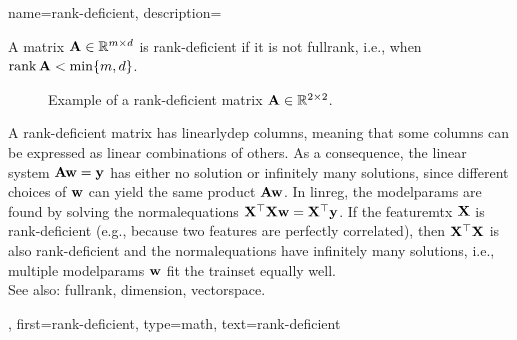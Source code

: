{name={rank-deficient},
	description={A \gls{matrix} ${\bf A} \in \mathbb{R}^{m \times d}$ 
         	is \gls{rank}-deficient if it is not 
		\gls{fullrank}, i.e., when $\operatorname*{rank}{{\bf A}} < \min\{m,d\}$.
 		\begin{figure}[H]
			\begin{center}
			\end{center}
		\caption{Example of a \gls{rank}-deficient \gls{matrix} 
			${\bf A} \in \mathbb{R}^{2 \times 2}$.	\label{fig_matrix_rank_defdict}} 
		\end{figure} 
		A \gls{rank}-deficient \gls{matrix} has \gls{linearlydep} columns,
		meaning that some columns can be expressed as linear combinations of others.
		As a consequence, the linear system ${\bf A} {\bf w} = {\bf y}$ has either no solution
		or infinitely many solutions, since different choices of ${\bf w}$ can yield
		the same product ${\bf A} {\bf w}$.
		In \gls{linreg}, the \glspl{modelparam} are found by solving the
		\gls{normalequations} ${\bf X}^{\top}{\bf X} {\bf w} = {\bf X}^{\top} {\bf y}$.
		If the \gls{featuremtx} ${\bf X}$ is \gls{rank}-deficient
		(e.g., because two \glspl{feature} are perfectly correlated),
		then ${\bf X}^{\top}{\bf X}$ is also \gls{rank}-deficient
		and the \gls{normalequations} have infinitely many solutions, i.e.,
		multiple \glspl{modelparam} ${\bf w}$ fit the \gls{trainset} equally well.
		\\
   		See also: \gls{fullrank}, \gls{dimension}, \gls{vectorspace}. }, 
	first={rank-deficient}, 
   	type=math,
   	text={rank-deficient}
}

